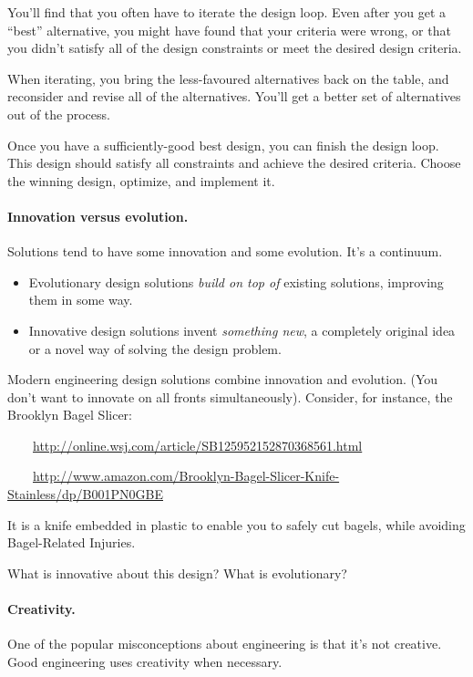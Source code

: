 You'll find that you often have to iterate the design loop. Even after you
get a ``best'' alternative, you might have found that your criteria were 
wrong, or that you didn't satisfy all of the design constraints or meet
the desired design criteria.

When iterating, you bring the less-favoured alternatives back on the table,
and reconsider and revise all of the alternatives. You'll get a better set
of alternatives out of the process.

Once you have a sufficiently-good best design, you can finish the
design loop. This design should satisfy all constraints and achieve the
desired criteria. Choose the winning design, optimize, and implement it.

\paragraph{Innovation versus evolution.} Solutions tend to have some
innovation and some evolution. It's a continuum.
\begin{itemize}
\item Evolutionary design solutions \emph{build on top of} existing solutions,
improving them in some way.
\item Innovative design solutions invent \emph{something new}, a completely
original idea or a novel way of solving the design problem.
\end{itemize}

Modern engineering design solutions combine innovation and evolution. 
(You don't want to innovate on all fronts simultaneously). 
Consider, for instance, the Brooklyn Bagel Slicer:

~~~~\url{http://online.wsj.com/article/SB125952152870368561.html}

~~~~\url{http://www.amazon.com/Brooklyn-Bagel-Slicer-Knife-Stainless/dp/B001PN0GBE}

It is a knife embedded in plastic to enable you to safely cut bagels,
while avoiding Bagel-Related Injuries. 

{\sf What is innovative about this design? What is evolutionary?}
\\[4em]

\paragraph{Creativity.} One of the popular misconceptions about
engineering is that it's not creative. Good engineering uses creativity
when necessary.

